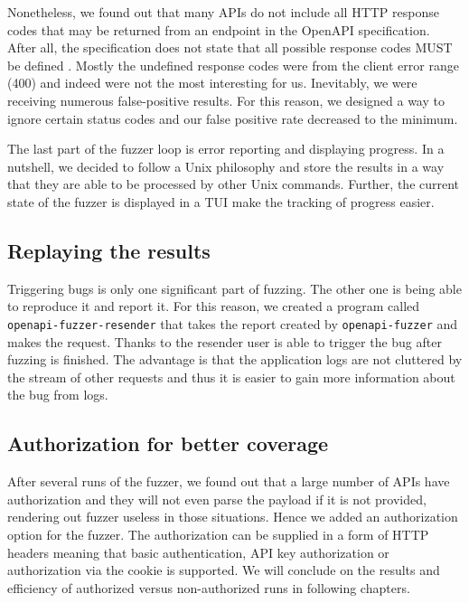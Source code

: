 Nonetheless, we found out that many APIs do not include all HTTP response codes that may be returned from an endpoint in the OpenAPI specification. After all, the specification does not state that all possible response codes MUST be defined \cite{openapi2020github}. Mostly the undefined response codes were from the client error range (400) and indeed were not the most interesting for us. Inevitably, we were receiving numerous false-positive results. For this reason, we designed a way to ignore certain status codes and our false positive rate decreased to the minimum.

The last part of the fuzzer loop is error reporting and displaying progress. In a nutshell, we decided to follow a Unix philosophy and store the results in a way that they are able to be processed by other Unix commands. Further, the current state of the fuzzer is displayed in a TUI make the tracking of progress easier.

\subsection{Replaying the results}
Triggering bugs is only one significant part of fuzzing. The other one is being able to reproduce it and report it. For this reason, we created a program called \newline \texttt{openapi-fuzzer-resender} that takes the report created by \texttt{openapi-fuzzer} and makes the request. Thanks to the resender user is able to trigger the bug after fuzzing is finished. The advantage is that the application logs are not cluttered by the stream of other requests and thus it is easier to gain more information about the bug from logs.

\subsection{Authorization for better coverage}
After several runs of the fuzzer, we found out that a large number of APIs have authorization and they will not even parse the payload if it is not provided, rendering out fuzzer useless in those situations. Hence we added an authorization option for the fuzzer. The authorization can be supplied in a form of HTTP headers meaning that basic authentication, API key authorization or authorization via the cookie is supported. We will conclude on the results and efficiency of authorized versus non-authorized runs in following chapters.
